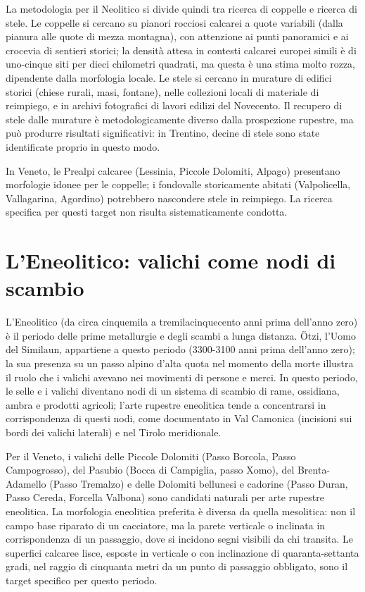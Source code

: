 La metodologia per il Neolitico si divide quindi tra ricerca di coppelle e ricerca di stele. Le coppelle si cercano su pianori rocciosi calcarei a quote variabili (dalla pianura alle quote di mezza montagna), con attenzione ai punti panoramici e ai crocevia di sentieri storici; la densità attesa in contesti calcarei europei simili è di uno-cinque siti per dieci chilometri quadrati, ma questa è una stima molto rozza, dipendente dalla morfologia locale. Le stele si cercano in murature di edifici storici (chiese rurali, masi, fontane), nelle collezioni locali di materiale di reimpiego, e in archivi fotografici di lavori edilizi del Novecento. Il recupero di stele dalle murature è metodologicamente diverso dalla prospezione rupestre, ma può produrre risultati significativi: in Trentino, decine di stele sono state identificate proprio in questo modo.

In Veneto, le Prealpi calcaree (Lessinia, Piccole Dolomiti, Alpago) presentano morfologie idonee per le coppelle; i fondovalle storicamente abitati (Valpolicella, Vallagarina, Agordino) potrebbero nascondere stele in reimpiego. La ricerca specifica per questi target non risulta sistematicamente condotta.

\section{L'Eneolitico: valichi come nodi di scambio}

L'Eneolitico (da circa cinquemila a tremilacinquecento anni prima dell'anno zero) è il periodo delle prime metallurgie e degli scambi a lunga distanza. Ötzi, l'Uomo del Similaun, appartiene a questo periodo (3300-3100 anni prima dell'anno zero); la sua presenza su un passo alpino d'alta quota nel momento della morte illustra il ruolo che i valichi avevano nei movimenti di persone e merci. In questo periodo, le selle e i valichi diventano nodi di un sistema di scambio di rame, ossidiana, ambra e prodotti agricoli; l'arte rupestre eneolitica tende a concentrarsi in corrispondenza di questi nodi, come documentato in Val Camonica (incisioni sui bordi dei valichi laterali) e nel Tirolo meridionale.

Per il Veneto, i valichi delle Piccole Dolomiti (Passo Borcola, Passo Campogrosso), del Pasubio (Bocca di Campiglia, passo Xomo), del Brenta-Adamello (Passo Tremalzo) e delle Dolomiti bellunesi e cadorine (Passo Duran, Passo Cereda, Forcella Valbona) sono candidati naturali per arte rupestre eneolitica. La morfologia eneolitica preferita è diversa da quella mesolitica: non il campo base riparato di un cacciatore, ma la parete verticale o inclinata in corrispondenza di un passaggio, dove si incidono segni visibili da chi transita. Le superfici calcaree lisce, esposte in verticale o con inclinazione di quaranta-settanta gradi, nel raggio di cinquanta metri da un punto di passaggio obbligato, sono il target specifico per questo periodo.

